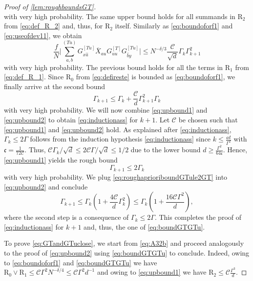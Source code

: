 \documentclass[10pt,a4paper]{amsart}
\numberwithin{equation}{section}
\newcommand*\barr[1]{\overline{#1}}
\newcommand*\bset[1]{[#1]}
\newcommand*\ubarr[1]{{\widehat{#1}}}
\begin{document}
\begin{proof}[Proof of \cref{lem:roughboundsGT}]
\begin{equation}
		\end{equation}
		with very high probability. The same upper bound holds for all summands in $\mathrm{R}_2$ from \cref{eq:def_R_2} and, thus, for $\mathrm{R}_2$ itself.  
		Similarly as \cref{eq:boundoforf1} and \cref{eq:useofdev11}, we obtain 
		\begin{equation}\label{eq:upboundforf2}
			\frac{f}{N}\biggl| \sum_{a,b}^{(Tu)} G_{x\ubarr{a}}^{\bset{Tu}} \barr{X}_{au} G_{uu}^{\bset{T}} G_{\ubarr{b}y}^{\bset{Tu}} \biggr| \le N^{- \delta/ 3 }\frac{\mathcal{C}}{\sqrt{d}} \Gamma_k \Gamma_{k+1}^{2}
		\end{equation}
		with very high probability. 
		The previous bound holds for all the terms in $\mathrm{R}_1$ from \cref{eq:def_R_1}. 
		Since $\mathrm{R}_0$ from \cref{eq:defireste} is bounded as \cref{eq:boundoforf1}, 
		we finally arrive at the second bound 
		\begin{equation}\label{eq:upbound2}
			\Gamma_{k+1} \le \Gamma_{k} + \frac{\mathcal{C}}{d} \Gamma_{k+1}^2 \Gamma_k
		\end{equation}
		with very high probability. 
		We will now combine \cref{eq:upbound1} and \cref{eq:upbound2} to obtain \cref{eq:inductionass} for $k + 1$. Let $\mathcal C$ be chosen such that \cref{eq:upbound1} and \cref{eq:upbound2} hold. As explained after \cref{eq:inductionass}, $\Gamma_k \leq  2 \Gamma$ follows from the induction hypothesis \cref{eq:inductionass} since $ k \le \frac{\mathfrak{c} d}{\Gamma^2}$ with $\mathfrak c = \frac{1}{72 \mathcal C}$. 
		Thus, $\mathcal{C}\Gamma_k/\sqrt{d} \le 2\mathcal{C}\Gamma/ \sqrt{d}\le 1/2$ due to the lower bound $d \geq \frac{\Gamma^2}{64\mathfrak c}$. Hence, \cref{eq:upbound1} yields the rough bound 
		\begin{equation}\label{eq:roughaprioriboundGTule2GT}
			\Gamma_{k+1} \le 2 \Gamma_k
		\end{equation}
		with very high probability. We plug \cref{eq:roughaprioriboundGTule2GT} into \cref{eq:upbound2} and conclude 
		\begin{equation*}
			\Gamma_{k+1} \le \Gamma_{k} \left( 1 + \frac{4\mathcal{C}}{d}  \Gamma_{k}^2 \right) \le \Gamma_{k} \left( 1 + \frac{16\mathcal{C}\Gamma^2}{d} \right),
		\end{equation*}
		where the second step is a consequence of $\Gamma_{k} \le 2 \Gamma$.
		This completes the proof of \cref{eq:inductionass} for $k +1$ and, thus, the one of \cref{eq:boundGTGTu}.
		
		To prove \cref{eq:GTandGTuclose}, we start from \cref{eq:A32b} and proceed 
		analogously to the proof of \cref{eq:upbound2} using \cref{eq:boundGTGTu} to conclude. Indeed, owing to \cref{eq:boundoforf1} and \cref{eq:boundGTGTu} we have $\mathrm{R}_0 \vee \mathrm{R}_1 \le \mathcal C \Gamma^ 2 N^{-\delta/4} \le \mathcal C \Gamma^2d^{-1}$ and owing to \cref{eq:upbound1} we have $\mathrm{R}_2 \le \mathcal C \frac{\Gamma^3}{d}$.  
	\end{proof}
	
\end{document}
